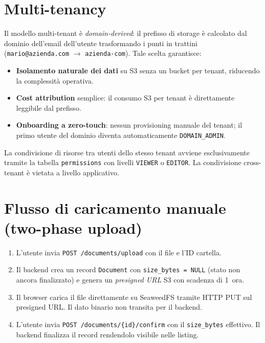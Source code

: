 \section{Multi-tenancy}
\label{sec:multitenancy}

Il modello multi-tenant \`e \emph{domain-derived}: il prefisso di storage \`e calcolato
dal dominio dell'email dell'utente trasformando i punti in trattini
(\texttt{mario@azienda.com} $\rightarrow$ \texttt{azienda-com}). Tale scelta garantisce:

\begin{itemize}[leftmargin=*]
    \item \textbf{Isolamento naturale dei dati} su S3 senza un bucket per tenant, riducendo
          la complessit\`a operativa.
    \item \textbf{Cost attribution} semplice: il consumo S3 per tenant \`e direttamente
          leggibile dal prefisso.
    \item \textbf{Onboarding a zero-touch}: nessun provisioning manuale del tenant;
          il primo utente del dominio diventa automaticamente \texttt{DOMAIN\_ADMIN}.
\end{itemize}

La condivisione di risorse tra utenti dello stesso tenant avviene esclusivamente tramite
la tabella \texttt{permissions} con livelli \texttt{VIEWER} o \texttt{EDITOR}. La
condivisione cross-tenant \`e vietata a livello applicativo.

\section{Flusso di caricamento manuale (two-phase upload)}
\label{sec:upload_flow}

\begin{enumerate}[leftmargin=*]
    \item L'utente invia \texttt{POST /documents/upload} con il file e l'ID cartella.
    \item Il backend crea un record \texttt{Document} con \texttt{size\_bytes = NULL}
          (stato non ancora finalizzato) e genera un \emph{presigned URL} S3 con
          scadenza di 1~ora.
    \item Il browser carica il file direttamente su SeaweedFS tramite HTTP PUT sul
          presigned URL. Il dato binario non transita per il backend.
    \item L'utente invia \texttt{POST /documents/\{id\}/confirm} con il \texttt{size\_bytes}
          effettivo. Il backend finalizza il record rendendolo visibile nelle listing.
\end{enumerate}

